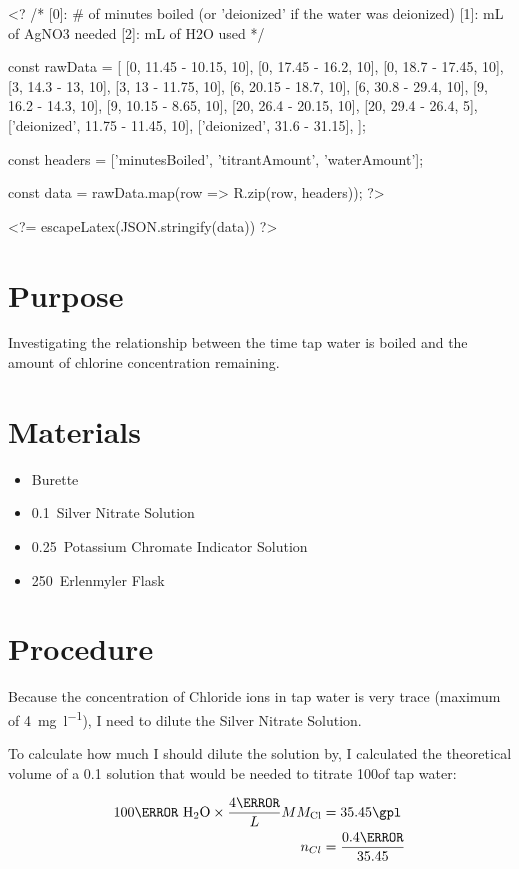 \documentclass[12pt]{article}
\begin{document}
<?
/*
[0]: # of minutes boiled (or 'deionized' if the water was deionized)
[1]: mL of AgNO3 needed
[2]: mL of H2O used
*/

const rawData = [
	[0, 11.45 - 10.15, 10],
	[0, 17.45 - 16.2, 10],
	[0, 18.7 - 17.45, 10],
	[3, 14.3 - 13, 10],
	[3, 13 - 11.75, 10],
	[6, 20.15 - 18.7, 10],
	[6, 30.8 - 29.4, 10],
	[9, 16.2 - 14.3, 10],
	[9, 10.15 - 8.65, 10],
	[20, 26.4 - 20.15, 10],
	[20, 29.4 - 26.4, 5],
	['deionized', 11.75 - 11.45, 10],
	['deionized', 31.6 - 31.15],
];

const headers = ['minutesBoiled', 'titrantAmount', 'waterAmount'];

const data = rawData.map(row => R.zip(row, headers));
?>

<?= escapeLatex(JSON.stringify(data)) ?>

\section*{Purpose}
Investigating the relationship between the time tap water is boiled and the amount of chlorine concentration remaining.

\section*{Materials}

\begin{itemize}
	\item Burette
	\item 0.1\mpl~Silver Nitrate Solution
	\item 0.25\mpl~Potassium Chromate Indicator Solution
	\item 250\ml~Erlenmyler Flask
\end{itemize}

\section*{Procedure}

Because the concentration of Chloride ions in tap water is very trace (maximum of \SI{4}{\mg\per\litre}), I need to dilute the Silver Nitrate Solution.

To calculate how much I should dilute the  solution by, I calculated the theoretical volume of a 0.1\mpl {} solution that would be needed to titrate 100\ml of tap water:

\begin{align*}
	100\ml~\ce{H2O} \times \frac{4\mg}{L} MM_{\ce{Cl}} & = 35.45\gpl
	\\
	n_{Cl}                                             & = \frac{0.4\mg}{35.45}
\end{align*}
\end{document}

